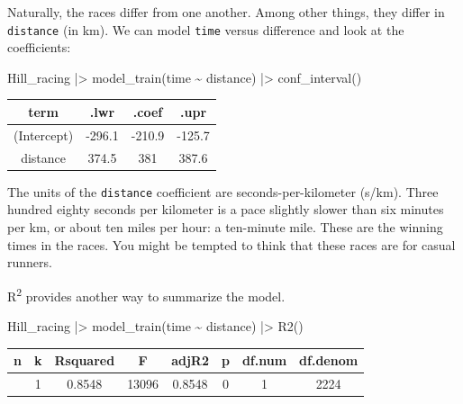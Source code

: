 \documentclass[
  letterpaper,
  DIV=11,
  numbers=noendperiod,
  oneside]{scrartcl}
\newenvironment{Shaded}{\begin{snugshade}}{\end{snugshade}}
\newcommand{\FunctionTok}[1]{\textcolor[rgb]{0.28,0.35,0.67}{#1}}
\newcommand{\NormalTok}[1]{\textcolor[rgb]{0.00,0.23,0.31}{#1}}
\newcommand{\SpecialCharTok}[1]{\textcolor[rgb]{0.37,0.37,0.37}{#1}}
\begin{document}
Naturally, the races differ from one another. Among other things, they
differ in \texttt{distance} (in km). We can model \texttt{time} versus
difference and look at the coefficients:

\begin{Shaded}
\begin{Highlighting}[]
\NormalTok{Hill\_racing }\SpecialCharTok{|\textgreater{}} \FunctionTok{model\_train}\NormalTok{(time }\SpecialCharTok{\textasciitilde{}}\NormalTok{ distance) }\SpecialCharTok{|\textgreater{}} \FunctionTok{conf\_interval}\NormalTok{()}
\end{Highlighting}
\end{Shaded}

\begin{longtable}[]{@{}cccc@{}}
\toprule\noalign{}
term & .lwr & .coef & .upr \\
\midrule\noalign{}
\endhead
\bottomrule\noalign{}
\endlastfoot
(Intercept) & -296.1 & -210.9 & -125.7 \\
distance & 374.5 & 381 & 387.6 \\
\end{longtable}

The units of the \texttt{distance} coefficient are seconds-per-kilometer
(s/km). Three hundred eighty seconds per kilometer is a pace slightly
slower than six minutes per km, or about ten miles per hour: a
ten-minute mile. These are the winning times in the races. You might be
tempted to think that these races are for casual runners.

R\textsuperscript{2} provides another way to summarize the model.

\begin{Shaded}
\begin{Highlighting}[]
\NormalTok{Hill\_racing }\SpecialCharTok{|\textgreater{}} \FunctionTok{model\_train}\NormalTok{(time }\SpecialCharTok{\textasciitilde{}}\NormalTok{ distance) }\SpecialCharTok{|\textgreater{}} \FunctionTok{R2}\NormalTok{()}
\end{Highlighting}
\end{Shaded}

\begin{longtable}[]{@{}cccccccc@{}}
\toprule\noalign{}
n & k & Rsquared & F & adjR2 & p & df.num & df.denom \\
\midrule\noalign{}
\endhead
\bottomrule\noalign{}
\endlastfoot
2226 & 1 & 0.8548 & 13096 & 0.8548 & 0 & 1 & 2224 \\
\end{longtable}
\end{document}
